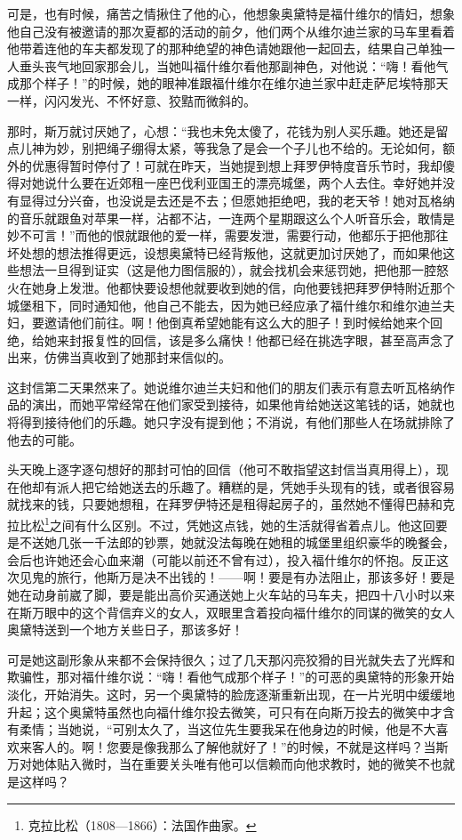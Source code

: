 \par 可是，也有时候，痛苦之情揪住了他的心，他想象奥黛特是福什维尔的情妇，想象他自己没有被邀请的那次夏都的活动的前夕，他们两个从维尔迪兰家的马车里看着他带着连他的车夫都发现了的那种绝望的神色请她跟他一起回去，结果自己单独一人垂头丧气地回家那会儿，当她叫福什维尔看他那副神色，对他说：“嗨！看他气成那个样子！”的时候，她的眼神准跟福什维尔在维尔迪兰家中赶走萨尼埃特那天一样，闪闪发光、不怀好意、狡黠而微斜的。
\par 那时，斯万就讨厌她了，心想：“我也未免太傻了，花钱为别人买乐趣。她还是留点儿神为妙，别把绳子绷得太紧，等我急了是会一个子儿也不给的。无论如何，额外的优惠得暂时停付了！可就在昨天，当她提到想上拜罗伊特度音乐节时，我却傻得对她说什么要在近郊租一座巴伐利亚国王的漂亮城堡，两个人去住。幸好她并没有显得过分兴奋，也没说是去还是不去；但愿她拒绝吧，我的老天爷！她对瓦格纳的音乐就跟鱼对苹果一样，沾都不沾，一连两个星期跟这么个人听音乐会，敢情是妙不可言！”而他的恨就跟他的爱一样，需要发泄，需要行动，他都乐于把他那往坏处想的想法推得更远，设想奥黛特已经背叛他，这就更加讨厌她了，而如果他这些想法一旦得到证实（这是他力图信服的），就会找机会来惩罚她，把他那一腔怒火在她身上发泄。他都快要设想他就要收到她的信，向他要钱把拜罗伊特附近那个城堡租下，同时通知他，他自己不能去，因为她已经应承了福什维尔和维尔迪兰夫妇，要邀请他们前往。啊！他倒真希望她能有这么大的胆子！到时候给她来个回绝，给她来封报复性的回信，该是多么痛快！他都已经在挑选字眼，甚至高声念了出来，仿佛当真收到了她那封来信似的。
\par 这封信第二天果然来了。她说维尔迪兰夫妇和他们的朋友们表示有意去听瓦格纳作品的演出，而她平常经常在他们家受到接待，如果他肯给她送这笔钱的话，她就也将得到接待他们的乐趣。她只字没有提到他；不消说，有他们那些人在场就排除了他去的可能。
\par 头天晚上逐字逐句想好的那封可怕的回信（他可不敢指望这封信当真用得上），现在他却有派人把它给她送去的乐趣了。糟糕的是，凭她手头现有的钱，或者很容易就找来的钱，只要她想租，在拜罗伊特还是租得起房子的，虽然她不懂得巴赫和克拉比松\footnote{克拉比松（1808—1866）：法国作曲家。}之间有什么区别。不过，凭她这点钱，她的生活就得省着点儿。他这回要是不送她几张一千法郎的钞票，她就没法每晚在她租的城堡里组织豪华的晚餐会，会后也许她还会心血来潮（可能以前还不曾有过），投入福什维尔的怀抱。反正这次见鬼的旅行，他斯万是决不出钱的！——啊！要是有办法阻止，那该多好！要是她在动身前崴了脚，要是能出高价买通送她上火车站的马车夫，把四十八小时以来在斯万眼中的这个背信弃义的女人，双眼里含着投向福什维尔的同谋的微笑的女人奥黛特送到一个地方关些日子，那该多好！
\par 可是她这副形象从来都不会保持很久；过了几天那闪亮狡猾的目光就失去了光辉和欺骗性，那对福什维尔说：“嗨！看他气成那个样子！”的可恶的奥黛特的形象开始淡化，开始消失。这时，另一个奥黛特的脸庞逐渐重新出现，在一片光明中缓缓地升起；这个奥黛特虽然也向福什维尔投去微笑，可只有在向斯万投去的微笑中才含有柔情；当她说，“可别太久了，当这位先生要我呆在他身边的时候，他是不大喜欢来客人的。啊！您要是像我那么了解他就好了！”的时候，不就是这样吗？当斯万对她体贴入微时，当在重要关头唯有他可以信赖而向他求教时，她的微笑不也就是这样吗？

